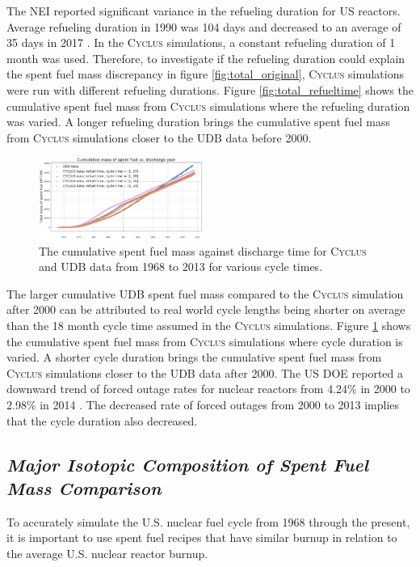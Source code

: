 \documentclass{anstrans}
\newcommand{\Cyclus}{\textsc{Cyclus}\xspace}%
\begin{document}
The \gls{NEI} reported significant variance in the refueling duration for \gls{US} reactors. Average 
refueling duration in 1990 was 104 days and decreased to an average of 35 days in 2017 \cite{iaea_current_nodate}. In the \Cyclus simulations, a constant refueling duration of 1 month was 
used. Therefore, to investigate if the refueling duration could explain the spent fuel mass discrepancy in figure \ref{fig:total_original}, \Cyclus simulations were run with different refueling durations.
Figure \ref{fig:total_refueltime} shows the cumulative spent fuel mass from \Cyclus simulations where 
the refueling duration was varied. A longer refueling duration brings the cumulative spent fuel mass 
from \Cyclus simulations closer to the \gls{UDB} data before 2000.

\begin{figure}[b] %
	\centering
	\includegraphics[width=0.48\textwidth]{figures/cumulative_mass_udb_cyclus_cycletime}
	\caption{The cumulative spent fuel mass against discharge time for \Cyclus and \gls{UDB} data from 1968 to 2013 for various cycle times.}
	\label{fig:total_cycletime}
\end{figure} 

The larger cumulative \gls{UDB} spent fuel mass compared to the \Cyclus simulation 
after 2000 can be attributed to real world cycle lengths being shorter on 
average than the 18 month cycle time assumed in the \Cyclus simulations. 
Figure \ref{fig:total_cycletime} shows the cumulative spent fuel mass from 
\Cyclus simulations where cycle duration is varied. A shorter cycle duration brings the 
cumulative spent fuel mass from \Cyclus simulations closer to the \gls{UDB} data after 
2000. The \gls{US} \gls{DOE} reported a downward trend of forced outage 
rates for nuclear reactors from 4.24\%  in 2000 to 2.98\% in 2014 \cite{gehin_nuclear_2016}. 
The decreased rate of forced outages from 2000 to 2013 implies that the cycle duration also 
decreased. 

\subsection{\textit{Major Isotopic Composition of  Spent Fuel Mass Comparison}}
To accurately simulate the U.S. nuclear fuel cycle from 1968 through the present, 
it is important to use spent fuel recipes that have similar burnup in relation to 
the average U.S. nuclear reactor burnup. 
\end{document}
